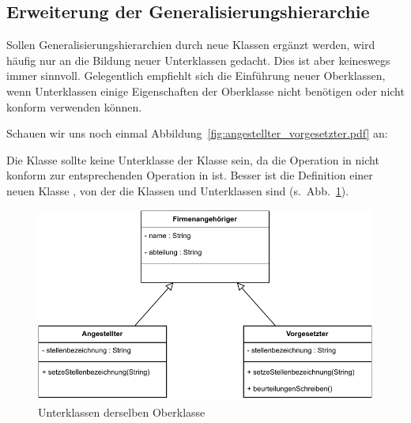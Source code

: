 \subsection{Erweiterung der Generalisierungshierarchie}
\label{sec:Kap-9.2.3}

Sollen Generalisierungshierarchien durch neue Klassen ergänzt werden, wird häufig nur an die Bildung neuer Unterklassen gedacht. Dies ist aber keineswegs immer sinnvoll. Gelegentlich empfiehlt sich die Einführung neuer Oberklassen, wenn Unterklassen einige Eigenschaften der Oberklasse nicht benötigen oder nicht konform verwenden können.

Schauen wir uns noch einmal Abbildung~\ref{fig:angestellter_vorgesetzter.pdf} an: 

Die Klasse  sollte keine Unter\-klasse der Klasse  sein, da die Operation  in  nicht konform zur entsprechenden Operation in  ist. Besser ist die Definition einer neuen Klasse , von der die Klassen  und  Unterklassen sind (s.~Abb.~\ref{fig:angestellter_vorgesetzter_firmenangehoeriger.pdf}).

\vspace{\baselineskip} %
\vspace{\baselineskip} %

\begin{figure}[h!]
	\centering
	\includegraphics{Bilder/Kapitel-9/angestellter_vorgesetzter_firmenangehoeriger.pdf}
	\vspace{\baselineskip} %
	\caption{Unterklassen derselben Oberklasse}
	\label{fig:angestellter_vorgesetzter_firmenangehoeriger.pdf}
\end{figure}

